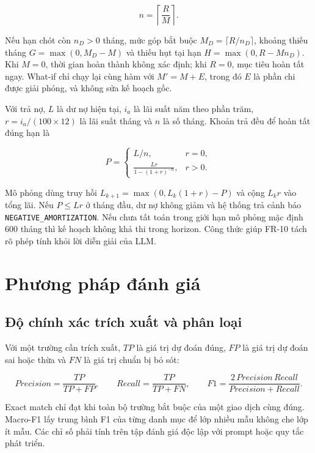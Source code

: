 \begin{equation}
  n=\left\lceil\frac{R}{M}\right\rceil.
\end{equation}

Nếu hạn chót còn $n_D>0$ tháng, mức góp bắt buộc
$M_D=\lceil R/n_D\rceil$, khoảng thiếu tháng $G=\max(0,M_D-M)$ và thiếu
hụt tại hạn $H=\max(0,R-Mn_D)$. Khi $M=0$, thời gian hoàn thành không
xác định; khi $R=0$, mục tiêu hoàn tất ngay. What-if chỉ chạy lại cùng
hàm với $M'=M+E$, trong đó $E$ là phần chi được giải phóng, và không sửa
kế hoạch gốc.

Với trả nợ, $L$ là dư nợ hiện tại, $i_a$ là lãi suất năm theo phần trăm,
$r=i_a/(100\times12)$ là lãi suất tháng và $n$ là số tháng. Khoản trả
đều để hoàn tất đúng hạn là

\begin{equation}
  P=
  \left\{
  \begin{array}{ll}
    L/n, & r=0,\\[2mm]
    \displaystyle\frac{Lr}{1-(1+r)^{-n}}, & r>0.
  \end{array}
  \right.
\end{equation}

Mô phỏng dùng truy hồi
$L_{k+1}=\max(0,L_k(1+r)-P)$ và cộng $L_kr$ vào tổng lãi. Nếu
$P\leq Lr$ ở tháng đầu, dư nợ không giảm và hệ thống trả cảnh báo
\texttt{NEGATIVE\_AMORTIZATION}. Nếu chưa tất toán trong giới hạn mô
phỏng mặc định 600 tháng thì kế hoạch không khả thi trong horizon.
Công thức giúp FR-10 tách rõ phép tính khỏi lời diễn giải của LLM.

\section{Phương pháp đánh giá}

\subsection{Độ chính xác trích xuất và phân loại}

Với một trường cần trích xuất, $TP$ là giá trị dự đoán đúng, $FP$ là
giá trị dự đoán sai hoặc thừa và $FN$ là giá trị chuẩn bị bỏ sót:

\begin{equation}
  Precision=\frac{TP}{TP+FP},\qquad
  Recall=\frac{TP}{TP+FN},\qquad
  F1=\frac{2\,Precision\,Recall}{Precision+Recall}.
\end{equation}

Exact match chỉ đạt khi toàn bộ trường bắt buộc của một giao dịch cùng
đúng. Macro-F1 lấy trung bình F1 của từng danh mục để lớp nhiều mẫu
không che lớp ít mẫu. Các chỉ số phải tính trên tập đánh giá độc lập với
prompt hoặc quy tắc phát triển.

